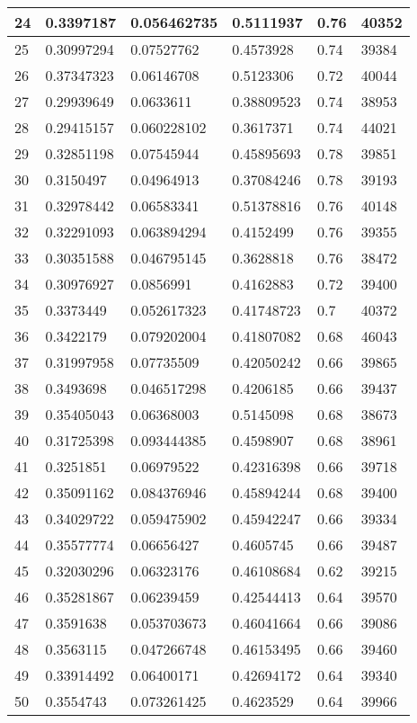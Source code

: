 \begin{longtable}{|l|l|l|l|l|l|}
24 & 0.3397187 & 0.056462735 & 0.5111937 & 0.76 & 40352 \\ \hline 
25 & 0.30997294 & 0.07527762 & 0.4573928 & 0.74 & 39384 \\ \hline 
26 & 0.37347323 & 0.06146708 & 0.5123306 & 0.72 & 40044 \\ \hline 
27 & 0.29939649 & 0.0633611 & 0.38809523 & 0.74 & 38953 \\ \hline 
28 & 0.29415157 & 0.060228102 & 0.3617371 & 0.74 & 44021 \\ \hline 
29 & 0.32851198 & 0.07545944 & 0.45895693 & 0.78 & 39851 \\ \hline 
30 & 0.3150497 & 0.04964913 & 0.37084246 & 0.78 & 39193 \\ \hline 
31 & 0.32978442 & 0.06583341 & 0.51378816 & 0.76 & 40148 \\ \hline 
32 & 0.32291093 & 0.063894294 & 0.4152499 & 0.76 & 39355 \\ \hline 
33 & 0.30351588 & 0.046795145 & 0.3628818 & 0.76 & 38472 \\ \hline 
34 & 0.30976927 & 0.0856991 & 0.4162883 & 0.72 & 39400 \\ \hline 
35 & 0.3373449 & 0.052617323 & 0.41748723 & 0.7 & 40372 \\ \hline 
36 & 0.3422179 & 0.079202004 & 0.41807082 & 0.68 & 46043 \\ \hline 
37 & 0.31997958 & 0.07735509 & 0.42050242 & 0.66 & 39865 \\ \hline 
38 & 0.3493698 & 0.046517298 & 0.4206185 & 0.66 & 39437 \\ \hline 
39 & 0.35405043 & 0.06368003 & 0.5145098 & 0.68 & 38673 \\ \hline 
40 & 0.31725398 & 0.093444385 & 0.4598907 & 0.68 & 38961 \\ \hline 
41 & 0.3251851 & 0.06979522 & 0.42316398 & 0.66 & 39718 \\ \hline 
42 & 0.35091162 & 0.084376946 & 0.45894244 & 0.68 & 39400 \\ \hline 
43 & 0.34029722 & 0.059475902 & 0.45942247 & 0.66 & 39334 \\ \hline 
44 & 0.35577774 & 0.06656427 & 0.4605745 & 0.66 & 39487 \\ \hline 
45 & 0.32030296 & 0.06323176 & 0.46108684 & 0.62 & 39215 \\ \hline 
46 & 0.35281867 & 0.06239459 & 0.42544413 & 0.64 & 39570 \\ \hline 
47 & 0.3591638 & 0.053703673 & 0.46041664 & 0.66 & 39086 \\ \hline 
48 & 0.3563115 & 0.047266748 & 0.46153495 & 0.66 & 39460 \\ \hline 
49 & 0.33914492 & 0.06400171 & 0.42694172 & 0.64 & 39340 \\ \hline 
50 & 0.3554743 & 0.073261425 & 0.4623529 & 0.64 & 39966 \\ \hline 
\end{longtable}